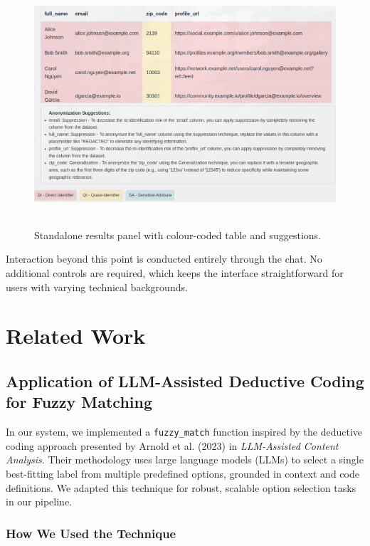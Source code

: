 \documentclass{article}
\begin{document}
\begin{figure}[h]
    \centering
    \includegraphics[width=0.85\linewidth,height=9cm,keepaspectratio]{images/results_ui.jpg}
    \caption{Standalone results panel with colour-coded table and suggestions.}
    \label{fig:ui-table-only}
\end{figure}

Interaction beyond this point is conducted entirely through the chat.  
No additional controls are required, which keeps the interface straightforward for users with varying technical backgrounds.


\section{Related Work}
\subsection{Application of LLM-Assisted Deductive Coding for Fuzzy Matching}

In our system, we implemented a \texttt{fuzzy\_match} function inspired by the deductive coding approach presented by Arnold et al. (2023) in \textit{LLM-Assisted Content Analysis}. Their methodology uses large language models (LLMs) to select a single best-fitting label from multiple predefined options, grounded in context and code definitions. We adapted this technique for robust, scalable option selection tasks in our pipeline.

\subsubsection{How We Used the Technique}
\end{document}
